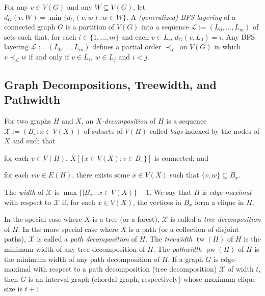 \documentclass[kpfonts]{patmorin}
\newcommand{\defin}[1]{\emph{\color{brightmaroon}#1}}
\DeclareMathOperator{\tw}{tw}
\DeclareMathOperator{\pw}{pw}
\theoremstyle{named}
\begin{document}
For any $v\in V(G)$ and any $W\subseteq V(G)$, let $d_G(v,W)=\min\{d_G(v,w):w\in W\}$. A \defin{(generalized) BFS layering} of a connected graph $G$ is a partition of $V(G)$ into a sequence $\mathcal{L}:=(L_0,\ldots,L_m)$ of sets such that, for each $i\in\{1,\ldots,m\}$ and each $v\in L_i$, $d_G(v,L_0)=i$.  Any BFS layering $\mathcal{L}:=(L_0,\ldots,L_m)$ defines a partial order $\prec_{\mathcal{L}}$ on $V(G)$ in which $v\prec_{\mathcal{L}} w$ if and only if $v\in L_i$, $w\in L_j$ and $i<j$.




\subsection{Graph Decompositions, Treewidth, and Pathwidth}

For two graphs $H$ and $X$, an \defin{$X$-decomposition} of $H$ is a sequence $\mathcal{X}:=(B_x:x\in V(X))$ of subsets of $V(H)$ called \defin{bags} indexed by the nodes of $X$ and such that
 \begin{inparaenum}[(i)]
     \item for each $v\in V(H)$, $X[\{x\in V(X):v\in B_x\}]$ is connected; and
     \item for each $vw\in E(H)$, there exists some $x\in V(X)$ such that $\{v,w\}\subseteq B_x$.
\end{inparaenum}
The \defin{width} of $\mathcal{X}$ is $\max\{|B_x|:x\in V(X)\}-1$. We say that $H$ is \defin{edge-maximal} with respect to $\mathcal{X}$ if, for each $x\in V(X)$, the vertices in $B_x$ form a clique in $H$.


In the special case where $X$ is a tree (or a forest), $\mathcal{X}$ is called a \defin{tree decomposition} of $H$.  In the more special case where $X$ is a path (or a collection of disjoint paths), $\mathcal{X}$ is called a \defin{path decomposition} of $H$. The \defin{treewidth} $\tw(H)$ of $H$ is the minimum width of any tree decomposition of $H$. The \defin{pathwidth} $\pw(H)$ of $H$ is the minimum width of any path decomposition of $H$.  If a graph $G$ is edge-maximal with respect to a path decomposition (tree decomposition) $\mathcal{X}$ of width $t$, then $G$ is an interval graph (chordal graph, respectively) whose maximum clique size is $t+1$ \cite{bodlaender:partial}.
\end{document}
